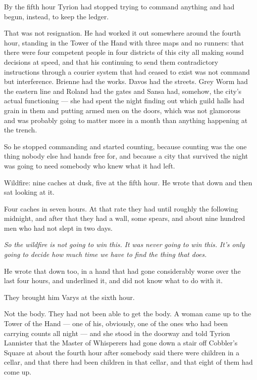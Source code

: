 By the fifth hour Tyrion had stopped trying to command anything and had begun, instead, to keep the ledger.

That was not resignation. He had worked it out somewhere around the fourth hour, standing in the Tower of the Hand with three maps and no runners: that there were four competent people in four districts of this city all making sound decisions at speed, and that his continuing to send them contradictory instructions through a courier system that had ceased to exist was not command but interference. Brienne had the works. Davos had the streets. Grey Worm had the eastern line and Roland had the gates and Sansa had, somehow, the city’s actual functioning — she had spent the night finding out which guild halls had grain in them and putting armed men on the doors, which was not glamorous and was probably going to matter more in a month than anything happening at the trench.

So he stopped commanding and started counting, because counting was the one thing nobody else had hands free for, and because a city that survived the night was going to need somebody who knew what it had left.

Wildfire: nine caches at dusk, five at the fifth hour. He wrote that down and then sat looking at it.

Four caches in seven hours. At that rate they had until roughly the following midnight, and after that they had a wall, some spears, and about nine hundred men who had not slept in two days.

\textit{So the wildfire is not going to win this. It was never going to win this. It’s only going to decide how much time we have to find the thing that does.}

He wrote that down too, in a hand that had gone considerably worse over the last four hours, and underlined it, and did not know what to do with it.

\sceneBreak

They brought him Varys at the sixth hour.

Not the body. They had not been able to get the body. A woman came up to the Tower of the Hand — one of his, obviously, one of the ones who had been carrying counts all night — and she stood in the doorway and told Tyrion Lannister that the Master of Whisperers had gone down a stair off Cobbler’s Square at about the fourth hour after somebody said there were children in a cellar, and that there had been children in that cellar, and that eight of them had come up.


